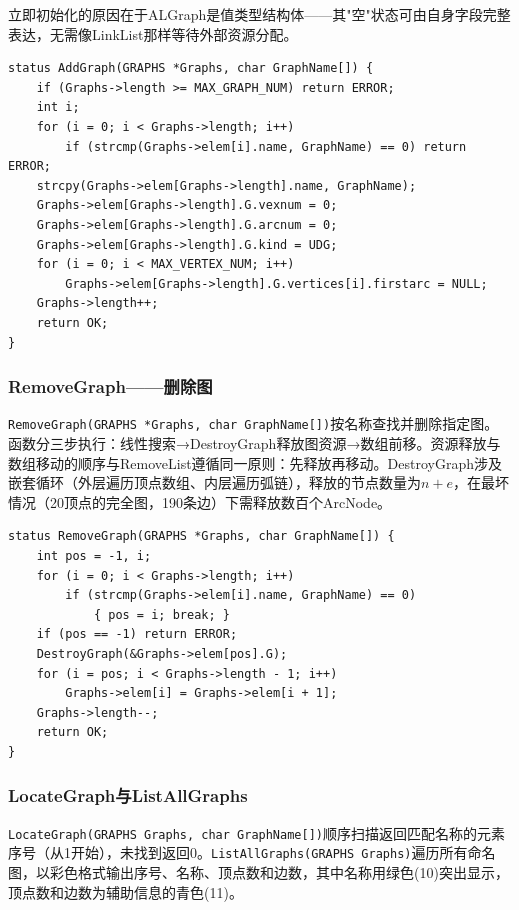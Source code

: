 \documentclass[supercite]{Experimental_Report}
\begin{document}
{立即初始化的原因在于ALGraph是值类型结构体——其"空"状态可由自身字段完整表达，无需像LinkList那样等待外部资源分配。

\begin{lstlisting}[caption={AddGraph函数}]
status AddGraph(GRAPHS *Graphs, char GraphName[]) {
    if (Graphs->length >= MAX_GRAPH_NUM) return ERROR;
    int i;
    for (i = 0; i < Graphs->length; i++)
        if (strcmp(Graphs->elem[i].name, GraphName) == 0) return ERROR;
    strcpy(Graphs->elem[Graphs->length].name, GraphName);
    Graphs->elem[Graphs->length].G.vexnum = 0;
    Graphs->elem[Graphs->length].G.arcnum = 0;
    Graphs->elem[Graphs->length].G.kind = UDG;
    for (i = 0; i < MAX_VERTEX_NUM; i++)
        Graphs->elem[Graphs->length].G.vertices[i].firstarc = NULL;
    Graphs->length++;
    return OK;
}
\end{lstlisting}

\subsubsection{RemoveGraph——删除图}

\texttt{RemoveGraph(GRAPHS *Graphs, char GraphName[])}按名称查找并删除指定图。函数分三步执行：线性搜索→DestroyGraph释放图资源→数组前移。资源释放与数组移动的顺序与RemoveList遵循同一原则：先释放再移动。DestroyGraph涉及嵌套循环（外层遍历顶点数组、内层遍历弧链），释放的节点数量为$n+e$，在最坏情况（20顶点的完全图，190条边）下需释放数百个ArcNode。

\begin{lstlisting}[caption={RemoveGraph函数}]
status RemoveGraph(GRAPHS *Graphs, char GraphName[]) {
    int pos = -1, i;
    for (i = 0; i < Graphs->length; i++)
        if (strcmp(Graphs->elem[i].name, GraphName) == 0)
            { pos = i; break; }
    if (pos == -1) return ERROR;
    DestroyGraph(&Graphs->elem[pos].G);
    for (i = pos; i < Graphs->length - 1; i++)
        Graphs->elem[i] = Graphs->elem[i + 1];
    Graphs->length--;
    return OK;
}
\end{lstlisting}

\subsubsection{LocateGraph与ListAllGraphs}

\texttt{LocateGraph(GRAPHS Graphs, char GraphName[])}顺序扫描返回匹配名称的元素序号（从1开始），未找到返回0。\texttt{ListAllGraphs(GRAPHS Graphs)}遍历所有命名图，以彩色格式输出序号、名称、顶点数和边数，其中名称用绿色(10)突出显示，顶点数和边数为辅助信息的青色(11)。

}
\end{document}
